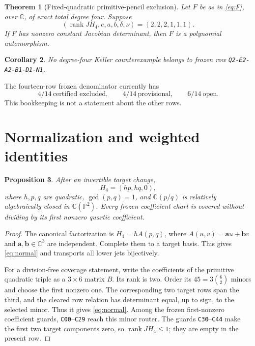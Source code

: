 \documentclass[11pt]{article}
\newtheorem{theorem}{Theorem}
\newtheorem{proposition}[theorem]{Proposition}
\newtheorem{corollary}[theorem]{Corollary}
\theoremstyle{remark}
\newcommand{\C}{\mathbb C}
\newcommand{\PP}{\mathbb P}
\newcommand{\rank}{\operatorname{rank}}
\begin{document}
\begin{theorem}[Fixed-quadratic primitive-pencil exclusion]
\label{thm:main}
Let $F$ be as in \eqref{eq:F}, over $\C$, of exact total degree four.
Suppose
\[
(\rank JH_4,e,a,b,\delta,\nu)=(2,2,2,1,1,1).
\]
If $F$ has nonzero constant Jacobian determinant, then $F$ is a polynomial
automorphism.
\end{theorem}

\begin{corollary}
No degree-four Keller counterexample belongs to frozen row
\texttt{Q2-E2-A2-B1-D1-N1}.
\end{corollary}

The fourteen-row frozen denominator currently has
\[
4/14\ \text{certified excluded},\qquad
4/14\ \text{provisional},\qquad
6/14\ \text{open}.
\]
This bookkeeping is not a statement about the other rows.

\section{Normalization and weighted identities}

\begin{proposition}\label{prop:normal}
After an invertible target change,
\begin{equation}
H_4=(hp,hq,0),                                      \label{eq:normal}
\end{equation}
where $h,p,q$ are quadratic, $\gcd(p,q)=1$, and
$\C(p/q)$ is relatively algebraically closed in $\C(\PP^2)$.
Every frozen coefficient chart is covered without dividing by its first
nonzero quartic coefficient.
\end{proposition}

\begin{proof}
The canonical factorization is $H_4=hA(p,q)$, where
$A(u,v)=\mathbf a u+\mathbf b v$ and $\mathbf a,\mathbf b\in\C^3$ are
independent.  Complete them to a target basis.  This gives
\eqref{eq:normal} and transports all lower jets bijectively.

For a division-free coverage statement, write the coefficients of the
primitive quadratic triple as a $3\times6$ matrix $B$.  Its rank is two.
Order its $45=3\binom62$ minors and choose the first nonzero one.  The
corresponding two target rows span the third, and the cleared row relation
has determinant equal, up to sign, to the selected minor.  Thus it gives
\eqref{eq:normal}.  Among the frozen first-nonzero coefficient guards,
\texttt{C00}--\texttt{C29} reach this minor router.  The guards
\texttt{C30}--\texttt{C44} make the first two target components zero, so
$\rank JH_4\le1$; they are empty in the present row.
\end{proof}
\end{document}
